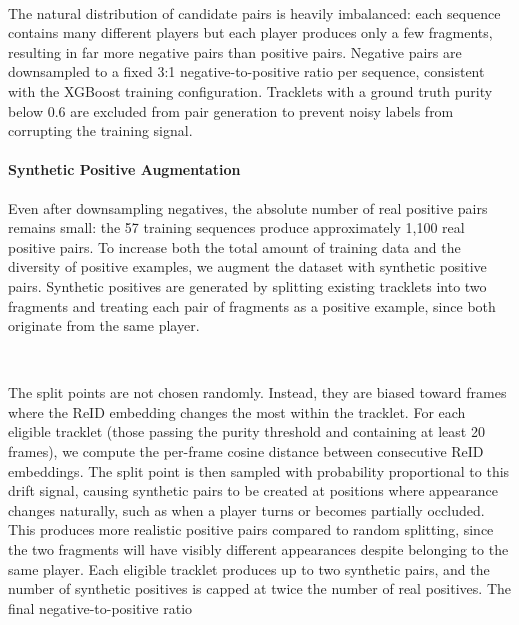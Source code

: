 \

The natural distribution of candidate pairs is heavily imbalanced: each sequence contains many different players but each player produces only a few fragments, resulting in far more negative pairs than positive pairs. Negative pairs are downsampled to a fixed 3:1 negative-to-positive ratio per sequence, consistent with the XGBoost training configuration. Tracklets with a ground truth purity below 0.6 are excluded from pair generation to prevent noisy labels from corrupting the training signal.

\paragraph{Synthetic Positive Augmentation}\label{par:synth_augmentation}
Even after downsampling negatives, the absolute number of real positive pairs remains small: the 57 training sequences produce approximately 1,100 real positive pairs. To increase both the total amount of training data and the diversity of positive examples, we augment the dataset with synthetic positive pairs. Synthetic positives are generated by splitting existing tracklets into two fragments and treating each pair of fragments as a positive example, since both originate from the same player.

\

The split points are not chosen randomly. Instead, they are biased toward frames where the ReID embedding changes the most within the tracklet. For each eligible tracklet (those passing the purity threshold and containing at least 20 frames), we compute the per-frame cosine distance between consecutive ReID embeddings. The split point is then sampled with probability proportional to this drift signal, causing synthetic pairs to be created at positions where appearance changes naturally, such as when a player turns or becomes partially occluded. This produces more realistic positive pairs compared to random splitting, since the two fragments will have visibly different appearances despite belonging to the same player. Each eligible tracklet produces up to two synthetic pairs, and the number of synthetic positives is capped at twice the number of real positives. The final negative-to-positive ratio 
